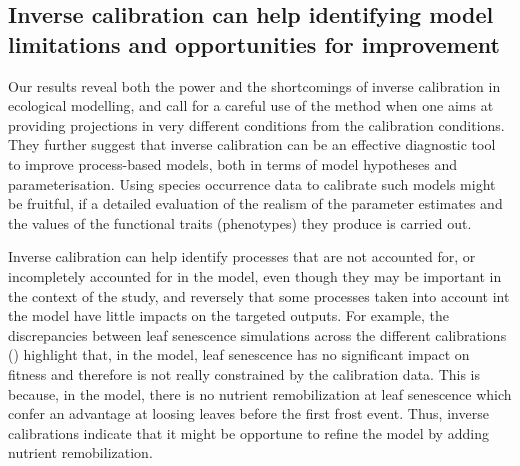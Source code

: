 \documentclass[letterpaper,8pt]{extarticle}  %
\begin{document}
\begin{doublespacing}
\begin{linenumbers}

\subsection{Inverse calibration can help identifying model limitations and opportunities for improvement}

Our results reveal both the power and the shortcomings of inverse calibration in ecological modelling, and call for a careful use of the method when one aims at providing projections in very different conditions from the calibration conditions. They further suggest that inverse calibration can be an effective diagnostic tool to improve  process-based models, both in terms of model hypotheses and parameterisation. Using species occurrence data to calibrate such models might be fruitful, if a detailed evaluation of the realism of the parameter estimates and the values of the functional traits (phenotypes) they produce is carried out.

Inverse calibration can help identify processes that are not accounted for, or incompletely accounted for in the model, even though they may be important in the context of the study, and reversely that some processes taken into account int the model have little impacts on the targeted outputs. For example, the discrepancies between leaf senescence simulations across the different calibrations () highlight that, in the model, leaf senescence has no significant impact on fitness and therefore is not really constrained by the calibration data. This is because, in the model, there is no nutrient remobilization at leaf senescence which confer an advantage at loosing leaves before the first frost event. Thus, inverse calibrations indicate that it might be opportune to refine the model by adding nutrient remobilization.


\end{linenumbers}
\end{doublespacing}
\end{document}
